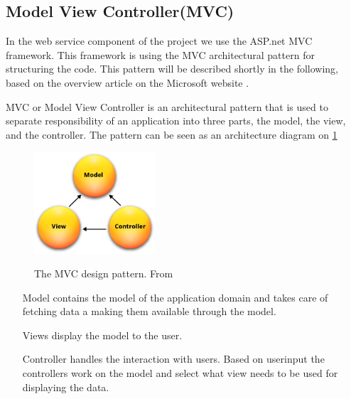 \subsection{Model View Controller(MVC)}
In the web service component of the project we use the ASP.net MVC framework. 
This framework is using the MVC architectural pattern for structuring the code.
This pattern will be described shortly in the following, based on the overview article on the Microsoft website \citet{aspmvc}.

MVC or Model View Controller is an architectural pattern that is used to separate responsibility of an application into three parts, the model, the view, and the controller.
The pattern can be seen as an architecture diagram on \cref{mvcdiagram}

\begin{figure}[h]
\center
\includegraphics[width=0.4\textwidth]{graphics/mvc}
\label{mvcdiagram}
\caption{The MVC design pattern. From \cite{aspmvc}}
\end{figure}

\begin{itemize}
\item[Model] contains the model of the application domain and takes care of fetching data a making them available through the model.
\item[Views] display the model to the user.
\item[Controller] handles the interaction with users. Based on userinput the controllers work on the model and select what view needs to be used for displaying the data.
\end{itemize}